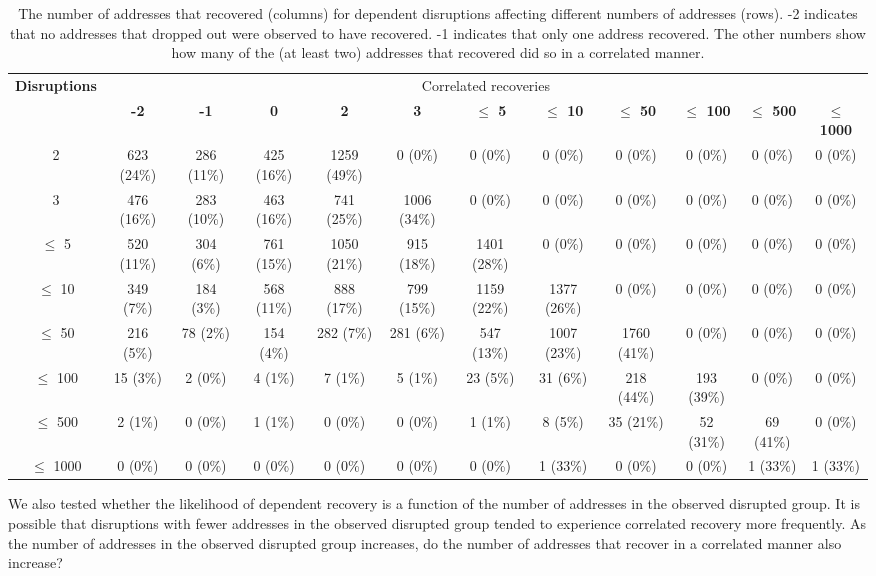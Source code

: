 \begin{table*}[th]
  \centering
  \hspace{-0.04in}\tiny
  \begin{tabular}{c|c|c|c|c|c|c|c|c|c|c|c|}
\textbf{Disruptions} & \multicolumn{11}{c|}{Correlated recoveries} \\
    & \textbf{-2} & \textbf{-1} & \textbf{0} & \textbf{2} &
    \textbf{3} & \textbf{$\leq$ 5} & \textbf{$\leq$ 10}  &
    \textbf{$\leq$ 50}  & \textbf{$\leq$ 100} & \textbf{$\leq$ 500}  &
    \textbf{$\leq$ 1000}\\
    \hline
2 & 623 (24\%) & 286 (11\%) & 425 (16\%) & 1259 (49\%) & 0 (0\%) & 0 (0\%) & 0 (0\%) & 0 (0\%) & 0 (0\%) & 0 (0\%) & 0 (0\%)\\
3 & 476 (16\%) & 283 (10\%) & 463 (16\%) & 741 (25\%) & 1006 (34\%) & 0 (0\%) & 0 (0\%) & 0 (0\%) & 0 (0\%) & 0 (0\%) & 0 (0\%)\\
$\leq$ 5 & 520 (11\%) & 304 (6\%) & 761 (15\%) & 1050 (21\%) & 915 (18\%) & 1401 (28\%) & 0 (0\%) & 0 (0\%) & 0 (0\%) & 0 (0\%) & 0 (0\%)\\
$\leq$ 10 & 349 (7\%) & 184 (3\%) & 568 (11\%) & 888 (17\%) & 799 (15\%) & 1159 (22\%) & 1377 (26\%) & 0 (0\%) & 0 (0\%) & 0 (0\%) & 0 (0\%)\\
$\leq$ 50 & 216 (5\%) & 78 (2\%) & 154 (4\%) & 282 (7\%) & 281 (6\%) & 547 (13\%) & 1007 (23\%) & 1760 (41\%) & 0 (0\%) & 0 (0\%) & 0 (0\%)\\
$\leq$ 100 & 15 (3\%) & 2 (0\%) & 4 (1\%) & 7 (1\%) & 5 (1\%) & 23 (5\%) & 31 (6\%) & 218 (44\%) & 193 (39\%) & 0 (0\%) & 0 (0\%)\\
$\leq$ 500 & 2 (1\%) & 0 (0\%) & 1 (1\%) & 0 (0\%) & 0 (0\%) & 1 (1\%) & 8 (5\%) & 35 (21\%) & 52 (31\%) & 69 (41\%) & 0 (0\%)\\
$\leq$ 1000 & 0 (0\%) & 0 (0\%) & 0 (0\%) & 0 (0\%) & 0 (0\%) & 0 (0\%) & 1 (33\%) & 0 (0\%) & 0 (0\%) & 1 (33\%) & 1 (33\%)\\
    \end{tabular}
  \caption{\label{tbl:nouts_vs_nrecs} The number of addresses that
    recovered (columns) for dependent disruptions affecting different numbers of
    addresses (rows). -2 indicates that no addresses that dropped out
    were observed to have recovered. -1 indicates that only one address recovered. The other
    numbers show how many of the (at least two) addresses that
    recovered did so in a correlated manner.
  }
\end{table*}

We also tested whether the likelihood of dependent recovery is a
function of the number of addresses in the observed disrupted group.
%
It is possible
that disruptions with fewer addresses in the observed disrupted group
tended to experience correlated recovery more frequently. 
%
As the number of
addresses in the observed disrupted group increases, do the number of
addresses that recover in a correlated manner also increase?

